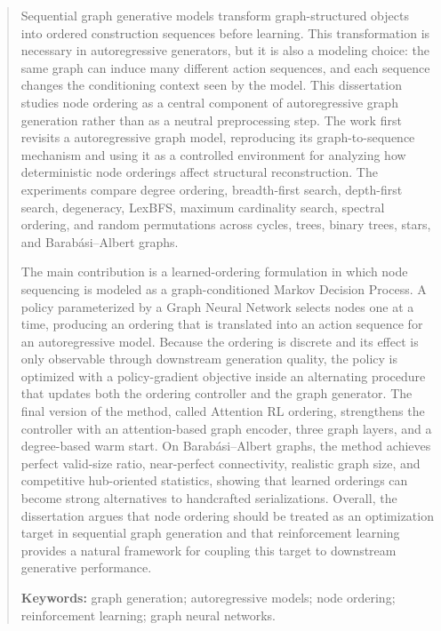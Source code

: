 \documentclass[12pt,a4paper,oneside]{report}
\begin{document}
\begin{abstract}
Sequential graph generative models transform graph-structured objects into ordered construction sequences before learning. This transformation is necessary in autoregressive generators, but it is also a modeling choice: the same graph can induce many different action sequences, and each sequence changes the conditioning context seen by the model. This dissertation studies node ordering as a central component of autoregressive graph generation rather than as a neutral preprocessing step. The work first revisits a autoregressive graph model, reproducing its graph-to-sequence mechanism and using it as a controlled environment for analyzing how deterministic node orderings affect structural reconstruction. The experiments compare degree ordering, breadth-first search, depth-first search, degeneracy, LexBFS, maximum cardinality search, spectral ordering, and random permutations across cycles, trees, binary trees, stars, and Barab\'asi--Albert graphs.

The main contribution is a learned-ordering formulation in which node sequencing is modeled as a graph-conditioned Markov Decision Process. A policy parameterized by a Graph Neural Network selects nodes one at a time, producing an ordering that is translated into an action sequence for an autoregressive model. Because the ordering is discrete and its effect is only observable through downstream generation quality, the policy is optimized with a policy-gradient objective inside an alternating procedure that updates both the ordering controller and the graph generator. The final version of the method, called Attention RL ordering, strengthens the controller with an attention-based graph encoder, three graph layers, and a degree-based warm start. On Barab\'asi--Albert graphs, the method achieves perfect valid-size ratio, near-perfect connectivity, realistic graph size, and competitive hub-oriented statistics, showing that learned orderings can become strong alternatives to handcrafted serializations. Overall, the dissertation argues that node ordering should be treated as an optimization target in sequential graph generation and that reinforcement learning provides a natural framework for coupling this target to downstream generative performance.

\textbf{Keywords:} graph generation; autoregressive models; node ordering; reinforcement learning; graph neural networks.
\end{abstract}

\clearpage
\end{document}
